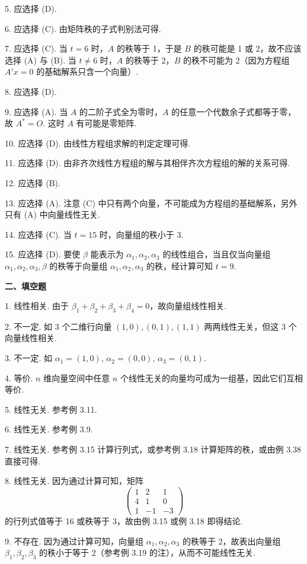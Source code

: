 \documentclass[UTF8,12pt,a4paper,fontset=fandol]{ctexart}
\begin{document}
5. 应选择 (D).

6. 应选择 (C). 由矩阵秩的子式判别法可得.

7. 应选择 (C). 当 $t=6$ 时，$A$ 的秩等于 1，于是 $B$ 的秩可能是 1 或 2，故不应该选择 (A) 与 (B). 当 $t\ne 6$ 时，$A$ 的秩等于 2，$B$ 的秩不可能为 2（因为方程组 $A'x=0$ 的基础解系只含一个向量）.

8. 应选择 (D).

9. 应选择 (A). 当 $A$ 的二阶子式全为零时，$A$ 的任意一个代数余子式都等于零，故 $A^*=O$. 这时 $A$ 有可能是零矩阵.

10. 应选择 (D). 由线性方程组求解的判定定理可得.

11. 应选择 (D). 由非齐次线性方程组的解与其相伴齐次方程组的解的关系可得.

12. 应选择 (B).

13. 应选择 (A). 注意 (C) 中只有两个向量，不可能成为方程组的基础解系，另外只有 (A) 中向量线性无关.

14. 应选择 (C). 当 $t=15$ 时，向量组的秩小于 3.

15. 应选择 (D). 要使 $\beta$ 能表示为 $\alpha_1,\alpha_2,\alpha_3$ 的线性组合，当且仅当向量组 $\alpha_1,\alpha_2,\alpha_3,\beta$ 的秩等于向量组 $\alpha_1,\alpha_2,\alpha_3$ 的秩，经计算可知 $t=9$.

\noindent\textbf{二、填空题}

1. 线性相关. 由于 $\beta_1+\beta_2+\beta_3+\beta_4=0$，故向量组线性相关.

2. 不一定. 如 3 个二维行向量 $(1,0),(0,1),(1,1)$ 两两线性无关，但这 3 个向量线性相关.

3. 不一定. 如 $\alpha_1=(1,0)$, $\alpha_2=(0,0)$, $\alpha_3=(0,1)$.

4. 等价. $n$ 维向量空间中任意 $n$ 个线性无关的向量均可成为一组基，因此它们互相等价.

5. 线性无关. 参考例 3.11.

6. 线性无关. 参考例 3.9.

7. 线性无关. 参考例 3.15 计算行列式，或参考例 3.18 计算矩阵的秩，或由例 3.38 直接可得.

8. 线性无关. 因为通过计算可知，矩阵
\[
\begin{pmatrix}
1&2&1\\
4&1&0\\
1&-1&-3
\end{pmatrix}
\]
的行列式值等于 16 或秩等于 3，故由例 3.15 或例 3.18 即得结论.

9. 不存在. 因为通过计算可知，向量组 $\alpha_1,\alpha_2,\alpha_3$ 的秩等于 2，故表出向量组 $\beta_1,\beta_2,\beta_3$ 的秩小于等于 2（参考例 3.19 的注），从而不可能线性无关.
\end{document}
